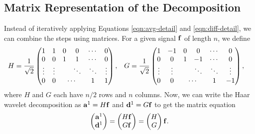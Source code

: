 \documentclass[12pt]{article}
\theoremstyle{definition}
\begin{document}
  \subsection{Matrix Representation of the Decomposition}

  Instead of iteratively applying Equations \eqref{eqn:avg-detail} and \eqref{eqn:diff-detail}, we can combine the steps using matrices.
  For a given signal \(\vb{f}\) of length \(n\), we define
  \begin{align}
    H &= \frac{1}{\sqrt{2}}
    \begin{pmatrix}
      1 & 1 & 0 & 0 & \cdots & 0\\
      0 & 0 & 1 & 1 & \cdots & 0\\
      \vdots & \vdots &  & \ddots & \ddots & \vdots\\
      0 & 0 & \multicolumn{2}{c}{\cdots} & 1 & 1
    \end{pmatrix},
    &
    G &= \frac{1}{\sqrt{2}}
    \begin{pmatrix}
      1 & -1 & 0 & 0 & \cdots & 0\\
      0 & 0 & 1 & -1 & \cdots & 0\\
      \vdots & \vdots &  & \ddots & \ddots & \vdots\\
      0 & 0 & \multicolumn{2}{c}{\cdots} & 1 & -1
    \end{pmatrix},
  \end{align}
  where \(H\) and \(G\) each have \(n/2\) rows and \(n\) columns. Now, we can write the Haar wavelet decomposition as \(\vb{a}^1 = H \vb{f}\) and \(\vb{d}^1 = G\vb{f}\) to get the matrix equation
  \begin{equation}
    \begin{pmatrix}
      \vb{a}^1 \\ \vb{d}^1
    \end{pmatrix} =
    \begin{pmatrix}
      H\vb{f} \\ G\vb{f}
    \end{pmatrix} =
    \begin{pmatrix}
      H \\ G
    \end{pmatrix} \vb{f}.
  \end{equation}
\end{document}
